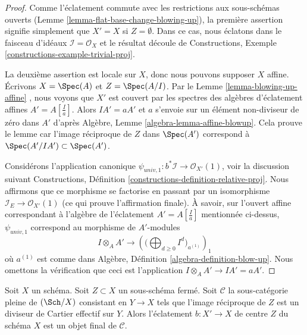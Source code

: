 \begin{proof}
Comme l'éclatement commute avec les restrictions aux sous-schémas ouverts (Lemme
 \ref{lemma-flat-base-change-blowing-up}), la première assertion signifie simplement que  $X' = X$  si
 $Z = \emptyset$. Dans ce cas, nous éclatons dans le faisceau d'idéaux  $\mathcal{I} = \mathcal{O}_X$  et
le résultat découle de Constructions, Exemple  \ref{constructions-example-trivial-proj}.

\medskip\noindent
La deuxième assertion est locale sur  $X$, donc nous pouvons supposer
 $X$  affine. Écrivons  $X = \Spec(A)$  et  $Z = \Spec(A/I)$. Par le Lemme
 \ref{lemma-blowing-up-affine} , nous voyons que  $X'$  est couvert par les spectres des
algèbres d'éclatement affines  $A' = A[\frac{I}{a}]$. Alors  $IA' = aA'$  et  $a$  s'envoie
sur un élément non-diviseur de zéro dans  $A'$  d'après Algèbre,
Lemme  \ref{algebra-lemma-affine-blowup}. Cela prouve le lemme car l'image réciproque de  $Z$ 
dans  $\Spec(A')$  correspond à  $\Spec(A'/IA') \subset \Spec(A')$.

\medskip\noindent
Considérons l'application canonique  $\psi_{univ, 1} : b^*\mathcal{I} \to \mathcal{O}_{X'}(1)$, voir la discussion suivant
Constructions, Définition  \ref{constructions-definition-relative-proj}. Nous affirmons que ce morphisme se factorise en passant par
un isomorphisme  $\mathcal{I}_E \to \mathcal{O}_{X'}(1)$  (ce qui prouve l'affirmation finale). À
savoir, sur l'ouvert affine correspondant à l'algèbre de l'éclatement  $A' = A[\frac{I}{a}]$ 
mentionnée ci-dessus,  $\psi_{univ, 1}$  correspond au morphisme de
 $A'$-modules
$$
I \otimes_A A'
\longrightarrow
\left(\Big(\bigoplus\nolimits_{d \geq 0} I^d\Big)_{a^{(1)}}\right)_1
$$
où  $a^{(1)}$  est comme dans Algèbre, Définition  \ref{algebra-definition-blow-up}. Nous omettons la
vérification que ceci est l'application  $I \otimes_A A' \to IA' = aA'$.
\end{proof}

\begin{lemma}
\label{lemma-universal-property-blowing-up}
Soit  $X$  un schéma. Soit  $Z \subset X$  un sous-schéma fermé. Soit
 $\mathcal{C}$  la sous-catégorie pleine de  $(\Sch/X)$  consistant en  $Y \to X$ 
tels que l'image réciproque de  $Z$  est un diviseur de Cartier effectif sur
 $Y$. Alors l'éclatement  $b : X' \to X$  de centre  $Z$  du schéma  $X$ 
est un objet final de  $\mathcal{C}$.
\end{lemma}

